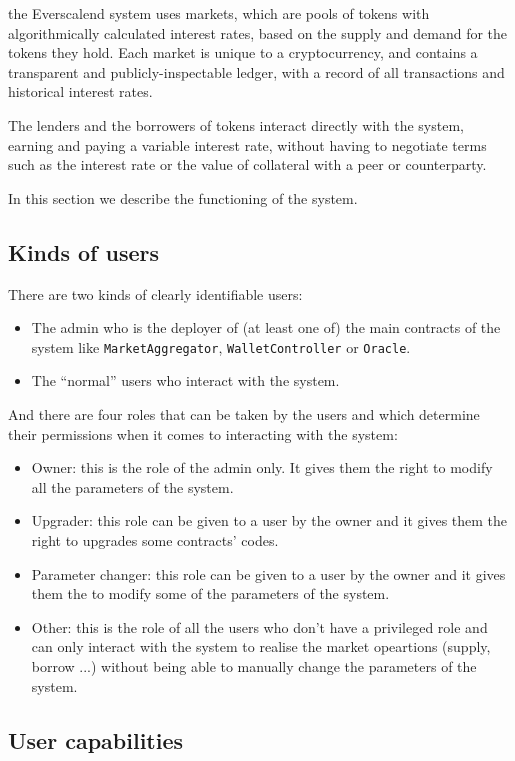 the Everscalend system uses markets, which are pools of tokens with algorithmically calculated interest rates, based on the supply and demand for the tokens they hold. Each market is unique to a cryptocurrency, and contains a transparent and publicly-inspectable ledger, with a record of all transactions and historical interest rates. 

The lenders and the borrowers of tokens interact directly with the system, earning and paying a variable interest rate, without having to negotiate terms such as the interest rate or the value of collateral with a peer or counterparty.

In this section we describe the functioning of the system.

\subsection{Kinds of users}

There are two kinds of clearly identifiable users:
\begin{itemize}
  \item The admin who is the deployer of (at least one of) the main contracts of the system like \verb|MarketAggregator|, \verb|WalletController| or \verb|Oracle|.
  \item The ``normal'' users who interact with the system. 
\end{itemize}
And there are four roles that can be taken by the users and which determine their permissions when it comes to interacting with the system:
\begin{itemize}
  \item Owner: this is the role of the admin only. It gives them the right to modify all the parameters of the system. 
  \item Upgrader: this role can be given to a user by the owner and it gives them the right to upgrades some contracts' codes.
  \item Parameter changer: this role can be given to a user by the owner and it gives them the to modify some of the parameters of the system.
  \item Other: this is the role of all the users who don't have a privileged role and can only interact with the system to realise the market opeartions (supply, borrow ...) without being able to manually change the parameters of the system. 
\end{itemize}

\subsection{User capabilities}

